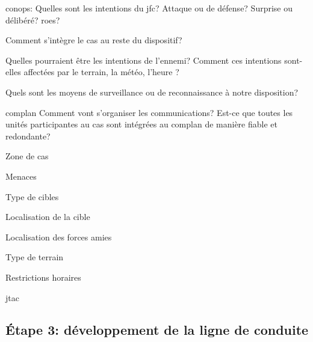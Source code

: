 \begin{e1}
	
	\begin{e2}
		\item \gls{conops}: Quelles sont les intentions du \gls{jfc}? Attaque ou de défense? Surprise ou délibéré? \glspl{roe}?
		\item Comment s'intègre le \gls{cas} au reste du dispositif?
		\item Quelles pourraient être les intentions de l'ennemi? Comment ces intentions sont-elles affectées par le terrain, la météo, l'heure ?
		\item Quels sont les moyens de surveillance ou de reconnaissance à notre disposition?
		\item \gls{complan} Comment vont s'organiser les communications? Est-ce que toutes les unités participantes au \gls{cas} sont intégrées au \gls{complan}  de manière fiable et redondante?
	\end{e2}
	
	
	\begin{e2}
		\item Zone de \gls{cas}
		\item Menaces
		\item Type de cibles
		\item Localisation de la cible
		\item Localisation des forces amies
		\item Type de terrain
		\item Restrictions horaires
		\item \gls{jtac}
	\end{e2}
\end{e1}

\subsection{Étape 3: développement de la ligne de conduite}


